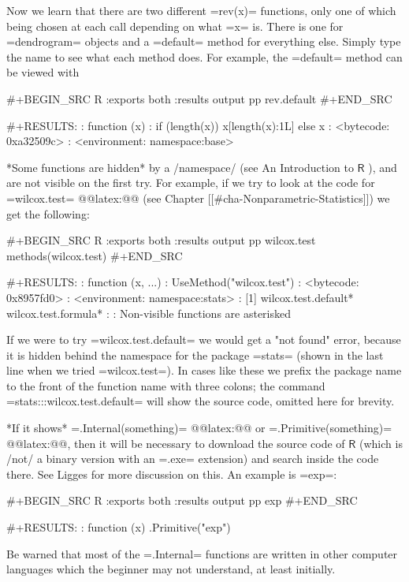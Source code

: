 Now we learn that there are two different =rev(x)= functions, only one
of which being chosen at each call depending on what =x= is. There is
one for =dendrogram= objects and a =default= method for everything
else. Simply type the name to see what each method does. For example,
the =default= method can be viewed with

#+BEGIN_SRC R :exports both :results output pp 
rev.default
#+END_SRC

#+RESULTS:
: function (x) 
: if (length(x)) x[length(x):1L] else x
: <bytecode: 0xa32509c>
: <environment: namespace:base>

*Some functions are hidden* by a /namespace/ (see An Introduction to
\(\mathsf{R}\) \cite{Venables2010}), and are not visible on the first
try. For example, if we try to look at the code for =wilcox.test=
@@latex:@@ (see Chapter [[#cha-Nonparametric-Statistics]]) we get the following:

#+BEGIN_SRC R :exports both :results output pp 
wilcox.test
methods(wilcox.test)
#+END_SRC

#+RESULTS:
: function (x, ...) 
: UseMethod("wilcox.test")
: <bytecode: 0x8957fd0>
: <environment: namespace:stats>
: [1] wilcox.test.default* wilcox.test.formula*
: 
:    Non-visible functions are asterisked

If we were to try =wilcox.test.default= we would get a "not found"
error, because it is hidden behind the namespace for the package
=stats= \cite{stats} (shown in the last line when we tried
=wilcox.test=). In cases like these we prefix the package name to the
front of the function name with three colons; the command
=stats:::wilcox.test.default= will show the source code, omitted here
for brevity.

*If it shows* =.Internal(something)=
@@latex:@@ or =.Primitive(something)=
@@latex:@@, then it will be necessary to
download the source code of \(\mathsf{R}\) (which is /not/ a binary
version with an =.exe= extension) and search inside the code
there. See Ligges \cite{Ligges2006} for more discussion on this. An
example is =exp=:

#+BEGIN_SRC R :exports both :results output pp 
exp
#+END_SRC

#+RESULTS:
: function (x)  .Primitive("exp")

Be warned that most of the =.Internal= functions are written in other
computer languages which the beginner may not understand, at least
initially.

